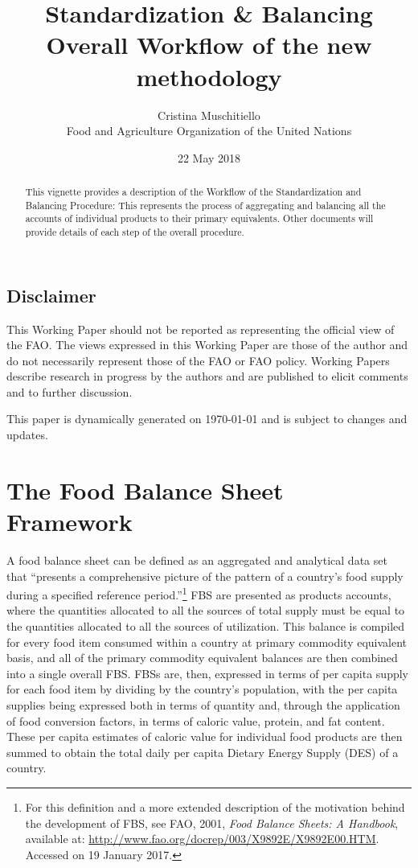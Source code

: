\documentclass[]{article}
\title{Standardization \& Balancing\\
Overall Workflow of the new methodology}
\author{Cristina Muschitiello\\
Food and Agriculture Organization of the United Nations}
\date{22 May 2018}
\let\rmarkdownfootnote\footnote%
\def\footnote{\protect\rmarkdownfootnote}
\begin{document}
\maketitle
\begin{abstract}
This vignette provides a description of the Workflow of the
Standardization and Balancing Procedure: This represents the process of
aggregating and balancing all the accounts of individual products to
their primary equivalents. Other documents will provide details of each
step of the overall procedure.
\end{abstract}

{
\setcounter{tocdepth}{4}
\tableofcontents
}
\subsection*{Disclaimer}\label{disclaimer}

This Working Paper should not be reported as representing the official
view of the FAO. The views expressed in this Working Paper are those of
the author and do not necessarily represent those of the FAO or FAO
policy. Working Papers describe research in progress by the authors and
are published to elicit comments and to further discussion.

This paper is dynamically generated on \today{} and is subject to
changes and updates.

\newpage

\section*{The Food Balance Sheet
Framework}\label{the-food-balance-sheet-framework}

A food balance sheet can be defined as an aggregated and analytical data
set that ``presents a comprehensive picture of the pattern of a
country's food supply during a specified reference period.''\footnote{For
  this definition and a more extended description of the motivation
  behind the development of FBS, see FAO, 2001, \emph{Food Balance
  Sheets: A Handbook}, available at:
  \url{http://www.fao.org/docrep/003/X9892E/X9892E00.HTM}. Accessed on
  19 January 2017.} FBS are presented as products accounts, where the
quantities allocated to all the sources of total supply must be equal to
the quantities allocated to all the sources of utilization. This balance
is compiled for every food item consumed within a country at primary
commodity equivalent basis, and all of the primary commodity equivalent
balances are then combined into a single overall FBS. FBSs are, then,
expressed in terms of per capita supply for each food item by dividing
by the country's population, with the per capita supplies being
expressed both in terms of quantity and, through the application of food
conversion factors, in terms of caloric value, protein, and fat content.
These per capita estimates of caloric value for individual food products
are then summed to obtain the total daily per capita Dietary Energy
Supply (DES) of a country.
\end{document}
